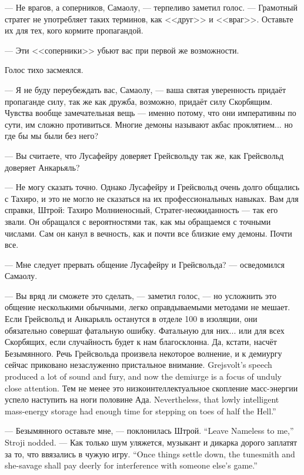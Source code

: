 --- Не врагов, а соперников, Самаолу, --- терпеливо заметил голос.
--- Грамотный стратег не употребляет таких терминов, как <<друг>> и <<враг>>.
Оставьте их для тех, кого кормите пропагандой.

--- Эти <<соперники>> убьют вас при первой же возможности.

Голос тихо засмеялся.

--- Я не буду переубеждать вас, Самаолу, --- ваша святая уверенность придаёт пропаганде силу, так же как дружба, возможно, придаёт силу Скорбящим.
Чувства вообще замечательная вещь --- именно потому, что они императивны по сути, им сложно противиться.
Многие демоны называют акбас проклятием... но где бы мы были без него?

--- Вы считаете, что Лусафейру доверяет Грейсвольду так же, как Грейсвольд доверяет Анкарьяль?

--- Не могу сказать точно.
Однако Лусафейру и Грейсвольд очень долго общались с Тахиро, и это не могло не сказаться на их профессиональных навыках.
Вам для справки, Штрой: Тахиро Молниеносный, Стратег-неожиданность --- так его звали.
Он обращался с вероятностями так, как мы обращаемся с точными числами.
Сам он канул в вечность, как и почти все близкие ему демоны.
Почти все.

--- Мне следует прервать общение Лусафейру и Грейсвольда? --- осведомился Самаолу.

--- Вы вряд ли сможете это сделать, --- заметил голос, --- но усложнить это общение несколькими обычными, легко оправдываемыми методами не мешает.
Если Грейсвольд и Анкарьяль останутся в отделе 100 в изоляции, они обязательно совершат фатальную ошибку.
Фатальную для них... или для всех Скорбящих, если случайность будет к нам благосклонна.
Да, кстати, насчёт Безымянного.
{Речь Грейсвольда произвела некоторое волнение, и к демиургу сейчас приковано незаслуженно пристальное внимание.}
{Grejsvolt's speech produced a lot of sound and fury, and now the demiurge is a focus of unduly close attention.}
{Тем не менее это низкоинтеллектуальное скопление масс-энергии успело наступить на ноги половине Ада.}
{Nevertheless, that lowly intelligent mass-energy storage had enough time for stepping on toes of half the Hell.''}

{--- Безымянного оставьте мне, --- поклонилась Штрой.}
{``Leave Nameless to me,'' Stroji nodded.}
{--- Как только шум уляжется, музыкант и дикарка дорого заплатят за то, что ввязались в чужую игру.}
{``Once things settle down, the tunesmith and she-savage shall pay deerly for interference with someone else's game.''}

